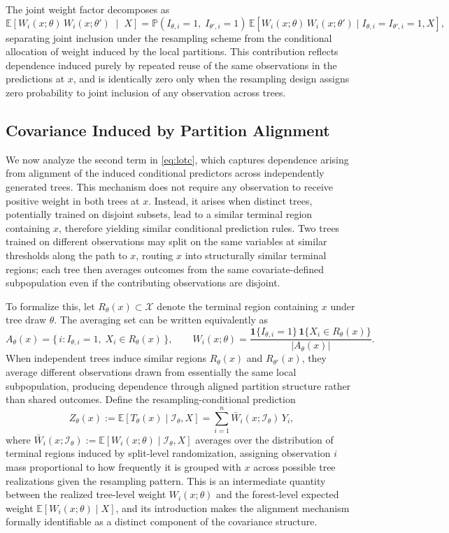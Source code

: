 \documentclass[11pt]{article}
\theoremstyle{plain}
\theoremstyle{definition}
\theoremstyle{remark}
\begin{document}
The joint weight factor decomposes as
\[
\mathbb E\!\left[
W_i(x;\theta)\,W_i(x;\theta')
\;\middle|\;
X
\right]
=
\mathbb P\!\left(
I_{\theta,i}=1,\;I_{\theta',i}=1
\right)
\,
\mathbb E\!\left[
W_i(x;\theta)\,W_i(x;\theta')
\mid
I_{\theta,i}=I_{\theta',i}=1, X
\right],
\]
separating joint inclusion under the resampling scheme from the conditional allocation of weight induced by the local partitions. This contribution reflects dependence induced purely by repeated reuse of the same observations in the predictions at $x$, and is identically zero only when the resampling design assigns zero probability to joint inclusion of any observation across trees.


\subsection{Covariance Induced by Partition Alignment}
\label{subsec:partition_alignment}

We now analyze the second term in \eqref{eq:lotc}, which captures dependence arising from alignment of the induced conditional predictors across independently generated trees. This mechanism does not require any observation to receive positive weight in both trees at $x$. Instead, it arises when distinct trees, potentially trained on disjoint subsets, lead to a similar terminal region containing $x$, therefore yielding similar conditional prediction rules. Two trees trained on different observations may split on the same variables at similar thresholds along the path to $x$, routing $x$ into structurally similar terminal regions; each tree then averages outcomes from the same covariate-defined subpopulation even if the contributing observations are disjoint.

To formalize this, let $R_\theta(x)\subset\mathcal X$ denote the terminal region containing $x$ under tree draw $\theta$. The averaging set can be written equivalently as
\[
A_\theta(x)=\{\, i : I_{\theta,i}=1,\; X_i \in R_\theta(x)\,\},
\qquad
W_i(x;\theta)=\frac{\mathbf 1\{I_{\theta,i}=1\}\,\mathbf 1\{X_i\in R_\theta(x)\}}{|A_\theta(x)|}.
\]
When independent trees induce similar regions $R_\theta(x)$ and $R_{\theta'}(x)$, they average different observations drawn from essentially the same local subpopulation, producing dependence through aligned partition structure rather than shared outcomes. Define the resampling-conditional prediction
\[
Z_\theta(x)
:=
\mathbb E[T_\theta(x)\mid \mathcal I_\theta, X]
=
\sum_{i=1}^n \bar W_i(x;\mathcal I_\theta)\,Y_i,
\]
where $\bar W_i(x;\mathcal I_\theta) := \mathbb E[W_i(x;\theta)\mid \mathcal I_\theta, X]$ averages over the distribution of terminal regions induced by split-level randomization, assigning observation $i$ mass proportional to how frequently it is grouped with $x$ across possible tree realizations given the resampling pattern. This is an intermediate quantity between the realized tree-level weight $W_i(x;\theta)$ and the forest-level expected weight $\mathbb{E}[W_i(x;\theta)\mid X]$, and its introduction makes the alignment mechanism formally identifiable as a distinct component of the covariance structure.
\end{document}

